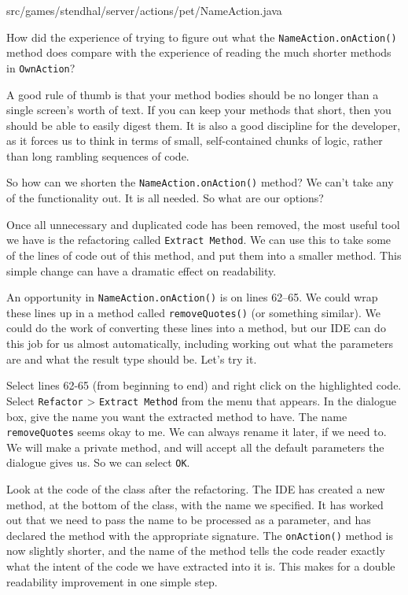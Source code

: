 \documentclass[
]{book}
\newenvironment{Shaded}{\begin{snugshade}}{\end{snugshade}}
\newcommand{\FunctionTok}[1]{\textcolor[rgb]{0.00,0.00,0.00}{#1}}
\newcommand{\NormalTok}[1]{#1}
\begin{document}
\begin{Shaded}
\begin{Highlighting}[]
\NormalTok{src/games/stendhal/server/actions/pet/NameAction.}\FunctionTok{java}
\end{Highlighting}
\end{Shaded}

How did the experience of trying to figure out what the \texttt{NameAction.onAction()} method does compare with the experience of reading the much shorter methods in \texttt{OwnAction}?

A good rule of thumb is that your method bodies should be no longer than a single screen's worth of text. If you can keep your methods that short, then you should be able to easily digest them. It is also a good discipline for the developer, as it forces us to think in terms of small, self-contained chunks of logic, rather than long rambling sequences of code.

So how can we shorten the \texttt{NameAction.onAction()} method? We can't take any of the functionality out. It is all needed. So what are our options?

Once all unnecessary and duplicated code has been removed, the most useful tool we have is the refactoring called \texttt{Extract\ Method}. We can use this to take some of the lines of code out of this method, and put them into a smaller method. This simple change can have a dramatic effect on readability.

An opportunity in \texttt{NameAction.onAction()} is on lines 62--65. We could wrap these lines up in a method called \texttt{removeQuotes()} (or something similar). We could do the work of converting these lines into a method, but our IDE can do this job for us almost automatically, including working out what the parameters are and what the result type should be. Let's try it.

Select lines 62-65 (from beginning to end) and right click on the highlighted code. Select \texttt{Refactor} \textgreater{} \texttt{Extract\ Method} from the menu that appears. In the dialogue box, give the name you want the extracted method to have. The name \texttt{removeQuotes} seems okay to me. We can always rename it later, if we need to. We will make a private method, and will accept all the default parameters the dialogue gives us. So we can select \texttt{OK}.

Look at the code of the class after the refactoring. The IDE has created a new method, at the bottom of the class, with the name we specified. It has worked out that we need to pass the name to be processed as a parameter, and has declared the method with the appropriate signature. The \texttt{onAction()} method is now slightly shorter, and the name of the method tells the code reader exactly what the intent of the code we have extracted into it is. This makes for a double readability improvement in one simple step.
\end{document}
